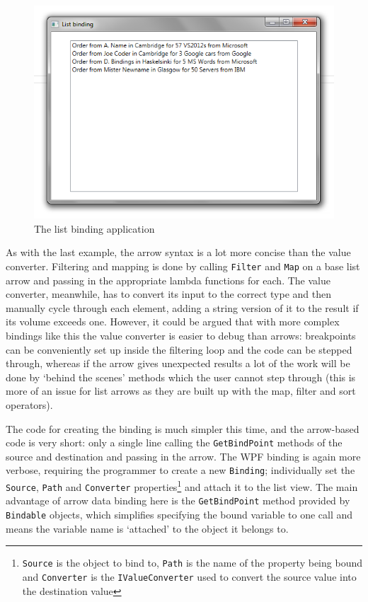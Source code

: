 \documentclass[12pt,twoside,notitlepage]{report}
\begin{document}

\begin{figure}[!ht]
  \centering
  \includegraphics[width=\textwidth]{fig/CaseStudyListBinding.png}
  \caption{The list binding application}
  \label{fig:case_study_list}
\end{figure}

As with the last example, the arrow syntax is a lot more concise than the value converter. Filtering and mapping is done by calling \texttt{Filter} and \texttt{Map} on a base list arrow and passing in the appropriate lambda functions for each. The value converter, meanwhile, has to convert its input to the correct type and then manually cycle through each element, adding a string version of it to the result if its volume exceeds one. However, it could be argued that with more complex bindings like this the value converter is easier to debug than arrows: breakpoints can be conveniently set up inside the filtering loop and the code can be stepped through, whereas if the arrow gives unexpected results a lot of the work will be done by `behind the scenes' methods which the user cannot step through (this is more of an issue for list arrows as they are built up with the map, filter and sort operators).

The code for creating the binding is much simpler this time, and the arrow-based code is very short: only a single line calling the \texttt{GetBindPoint} methods of the source and destination and passing in the arrow. The WPF binding is again more verbose, requiring the programmer to create a new \texttt{Binding}; individually set the \texttt{Source}, \texttt{Path} and \texttt{Converter} properties\footnote{\texttt{Source} is the object to bind to, \texttt{Path} is the name of the property being bound and \texttt{Converter} is the \texttt{IValueConverter} used to convert the source value into the destination value} and attach it to the list view. The main advantage of arrow data binding here is the \texttt{GetBindPoint} method provided by \texttt{Bindable} objects, which simplifies specifying the bound variable to one call and means the variable name is `attached' to the object it belongs to.
\end{document}
